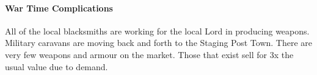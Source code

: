 \paragraph{War Time Complications} All of the local blacksmiths are working for the local Lord in producing weapons. Military caravans are moving back and forth to the Staging Post Town. There are very few weapons and armour on the market. Those that exist sell for 3x the usual value due to demand. 
